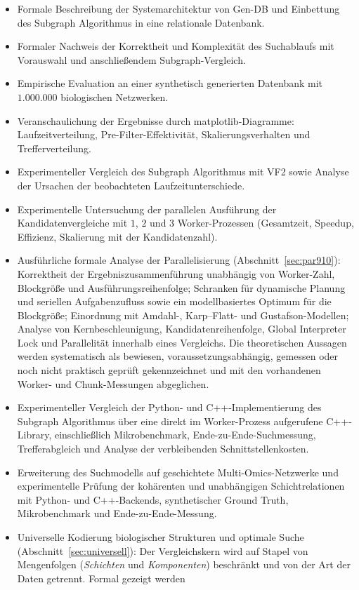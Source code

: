\documentclass[a4paper,12pt, twoside]{report}
\theoremstyle{definition}
\begin{document}
\begin{itemize}
	\item Formale Beschreibung der Systemarchitektur von Gen-DB und Einbettung des Subgraph Algorithmus in eine relationale Datenbank.
	\item Formaler Nachweis der Korrektheit und Komplexität des Suchablaufs mit Vorauswahl und anschließendem Subgraph-Vergleich.
	\item Empirische Evaluation an einer synthetisch generierten Datenbank mit $1.000.000$ biologischen Netzwerken.
	\item Veranschaulichung der Ergebnisse durch matplotlib-Diagramme: Laufzeitverteilung, Pre-Filter-Effektivität, Skalierungsverhalten und Trefferverteilung.
	\item Experimenteller Vergleich des Subgraph Algorithmus mit VF2 sowie Analyse der Ursachen der beobachteten Laufzeitunterschiede.
	\item Experimentelle Untersuchung der parallelen Ausführung der Kandidatenvergleiche mit $1$, $2$ und $3$ Worker-Prozessen (Gesamtzeit, Speedup, Effizienz, Skalierung mit der Kandidatenzahl).
	\item Ausführliche formale Analyse der Parallelisierung (Abschnitt~\ref{sec:par910}): Korrektheit der Ergebniszusammenführung unabhängig von Worker-Zahl, Blockgröße und Ausführungsreihenfolge; Schranken für dynamische Planung und seriellen Aufgabenzufluss sowie ein modellbasiertes Optimum für die Blockgröße; Einordnung mit Amdahl-, Karp--Flatt- und Gustafson-Modellen; Analyse von Kernbeschleunigung, Kandidatenreihenfolge, Global Interpreter Lock und Parallelität innerhalb eines Vergleichs. Die theoretischen Aussagen werden systematisch als bewiesen, voraussetzungsabhängig, gemessen oder noch nicht praktisch geprüft gekennzeichnet und mit den vorhandenen Worker- und Chunk-Messungen abgeglichen.
	\item Experimenteller Vergleich der Python- und C++-Implementierung des Subgraph Algorithmus über eine direkt im Worker-Prozess aufgerufene C++-Library, einschließlich Mikrobenchmark, Ende-zu-Ende-Suchmessung, Trefferabgleich und Analyse der verbleibenden Schnittstellenkosten.
	\item Erweiterung des Suchmodells auf geschichtete Multi-Omics-Netzwerke und experimentelle Prüfung der kohärenten und unabhängigen Schichtrelationen mit Python- und C++-Backends, synthetischer Ground Truth, Mikrobenchmark und Ende-zu-Ende-Messung.
	\item Universelle Kodierung biologischer Strukturen und optimale Suche (Abschnitt~\ref{sec:universell}): Der Vergleichskern wird auf Stapel von Mengenfolgen (\emph{Schichten} und \emph{Komponenten}) beschränkt und von der Art der Daten getrennt. Formal gezeigt werden

\end{itemize}
\end{document}
